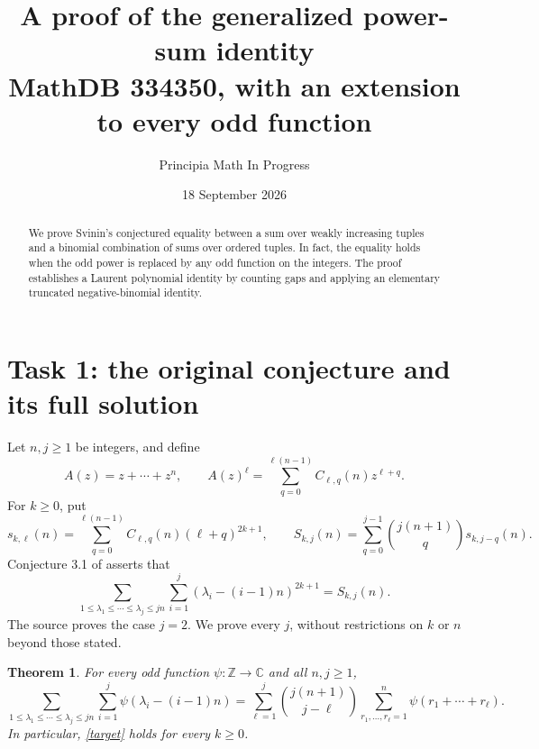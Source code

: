 \documentclass[11pt]{article}
\title{A proof of the generalized power-sum identity\\
\large MathDB 334350, with an extension to every odd function}
\author{Principia Math In Progress}
\date{18 September 2026}
\newtheorem{theorem}{Theorem}
\begin{document}
\maketitle
\begin{abstract}
We prove Svinin's conjectured equality between a sum over weakly
increasing tuples and a binomial combination of sums over ordered
tuples. In fact, the equality holds when the odd power is replaced
by any odd function on the integers. The proof establishes a
Laurent polynomial identity by counting gaps and applying an
elementary truncated negative-binomial identity.
\end{abstract}

\section*{Task 1: the original conjecture and its full solution}
Let $n,j\geq1$ be integers, and define
\[
 A(z)=z+\cdots+z^n,\qquad
 A(z)^\ell=\sum_{q=0}^{\ell(n-1)}C_{\ell,q}(n)z^{\ell+q}.
\]
For $k\geq0$, put
\[
 s_{k,\ell}(n)=\sum_{q=0}^{\ell(n-1)}C_{\ell,q}(n)(\ell+q)^{2k+1},
 \qquad
 S_{k,j}(n)=\sum_{q=0}^{j-1}\binom{j(n+1)}q s_{k,j-q}(n).
\]
Conjecture 3.1 of \cite{S} asserts that
\begin{equation}\label{target}
 \sum_{1\leq\lambda_1\leq\cdots\leq\lambda_j\leq jn}
       \sum_{i=1}^j(\lambda_i-(i-1)n)^{2k+1}=S_{k,j}(n).
\end{equation}
The source proves the case $j=2$. We prove every $j$, without
restrictions on $k$ or $n$ beyond those stated.

\begin{theorem}\label{main}
For every odd function $\psi:\mathbb Z\to\mathbb C$ and all
$n,j\geq1$,
\begin{equation}\label{strong}
 \sum_{1\leq\lambda_1\leq\cdots\leq\lambda_j\leq jn}
       \sum_{i=1}^j\psi(\lambda_i-(i-1)n)
 =\sum_{\ell=1}^j\binom{j(n+1)}{j-\ell}
       \sum_{r_1,\ldots,r_\ell=1}^n\psi(r_1+\cdots+r_\ell).
\end{equation}
In particular, \eqref{target} holds for every $k\geq0$.
\end{theorem}
\end{document}
